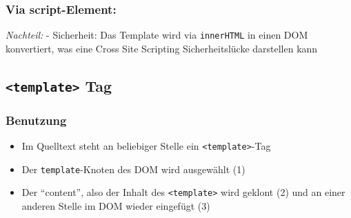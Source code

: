 \subsubsection{Via script-Element:}\label{via-script-element}

\begin{Shaded}
\begin{Highlighting}[]
\KeywordTok{>}
  \OperatorTok{<}\OperatorTok{>}
    \OperatorTok{<}\OperatorTok{=}\OperatorTok{>}
  \OperatorTok{<}
\OperatorTok{>}
\end{Highlighting}
\end{Shaded}

\emph{Nachteil:} - Sicherheit: Das Template wird via \texttt{innerHTML}
in einen DOM konvertiert, was eine Cross Site Scripting Sicherheitslücke
darstellen kann

\subsection{\texorpdfstring{\texttt{\textless{}template\textgreater{}}
Tag}{\textless{}template\textgreater{} Tag}}\label{template-tag}

\begin{Shaded}
\begin{Highlighting}[]
\KeywordTok{>}
  \KeywordTok{>} 
\end{Highlighting}
\end{Shaded}

\subsubsection{Benutzung}\label{benutzung}

\begin{itemize}
\tightlist
\item
  Im Quelltext steht an beliebiger Stelle ein
  \texttt{\textless{}template\textgreater{}}-Tag
\item
  Der \texttt{template}-Knoten des DOM wird ausgewählt (1)
\item
  Der ``content'', also der Inhalt des
  \texttt{\textless{}template\textgreater{}} wird geklont (2) und an
  einer anderen Stelle im DOM wieder eingefügt (3)
\end{itemize}

